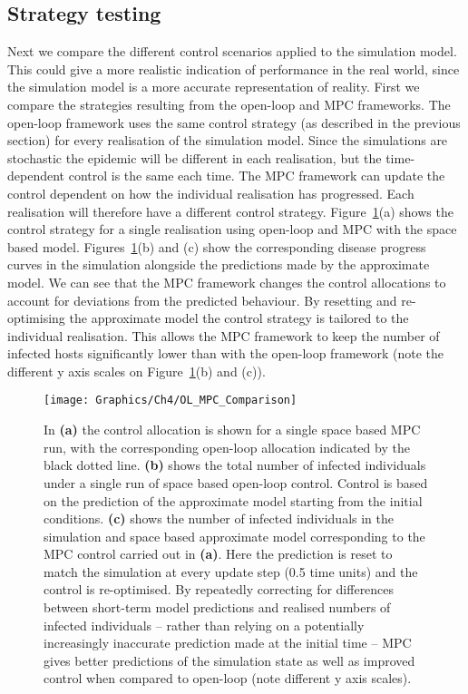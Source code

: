 \subsection{Strategy testing}

Next we compare the different control scenarios applied to the simulation model. This could give a more realistic indication of performance in the real world, since the simulation model is a more accurate representation of reality. First we compare the strategies resulting from the open-loop and MPC frameworks. The open-loop framework uses the same control strategy (as described in the previous section) for every realisation of the simulation model. Since the simulations are stochastic the epidemic will be different in each realisation, but the time-dependent control is the same each time. The MPC framework can update the control dependent on how the individual realisation has progressed. Each realisation will therefore have a different control strategy. Figure~\ref{fig:ch4:ol_mpc_comparison}(a) shows the control strategy for a single realisation using open-loop and MPC with the space based model. Figures~\ref{fig:ch4:ol_mpc_comparison}(b) and (c) show the corresponding disease progress curves in the simulation alongside the predictions made by the approximate model. We can see that the MPC framework changes the control allocations to account for deviations from the predicted behaviour. By resetting and re-optimising the approximate model the control strategy is tailored to the individual realisation. This allows the MPC framework to keep the number of infected hosts significantly lower than with the open-loop framework (note the different y axis scales on Figure~\ref{fig:ch4:ol_mpc_comparison}(b) and (c)).

\begin{figure}[h]
    \begin{center}
        \texttt{[image: Graphics/Ch4/OL\_MPC\_Comparison]}
        \caption[Comparing open-loop and MPC optimal strategies]{In \textbf{(a)} the control allocation is shown for a single space based MPC run, with the corresponding open-loop allocation indicated by the black dotted line. \textbf{(b)} shows the total number of infected individuals under a single run of space based open-loop control. Control is based on the prediction of the approximate model starting from the initial conditions. \textbf{(c)} shows the number of infected individuals in the simulation and space based approximate model corresponding to the MPC control carried out in \textbf{(a)}. Here the prediction is reset to match the simulation at every update step (0.5 time units) and the control is re-optimised. By repeatedly correcting for differences between short-term model predictions and realised numbers of infected individuals -- rather than relying on a potentially increasingly inaccurate prediction made at the initial time -- MPC gives better predictions of the simulation state as well as improved control when compared to open-loop (note different y axis scales).}
        \label{fig:ch4:ol_mpc_comparison}
    \end{center}
\end{figure}

